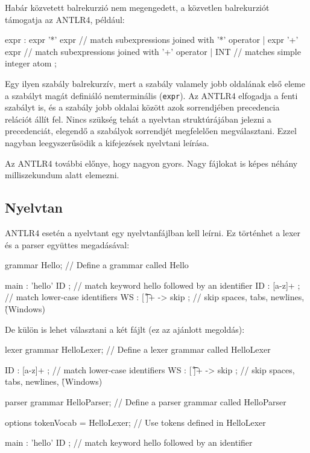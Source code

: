 \documentclass[12pt, a4paper]{report}
\newcommand{\f}[1]{\texttt{#1}}
\begin{document}
Habár közvetett balrekurzió nem megengedett, a közvetlen balrekurziót támogatja az ANTLR4, például:

\begin{antlr4code}
expr : expr '*' expr // match subexpressions joined with '*' operator
     | expr '+' expr // match subexpressions joined with '+' operator
     | INT // matches simple integer atom
;
\end{antlr4code}

Egy ilyen szabály balrekurzív, mert a szabály valamely jobb oldalának első eleme a szabályt magát definiáló nemterminális (\f{expr}). Az ANTLR4 elfogadja a fenti szabályt is, és a szabály jobb oldalai között azok sorrendjében precedencia relációt állít fel. Nincs szükség tehát a nyelvtan struktúrájában jelezni a precedenciát, elegendő a szabályok sorrendjét megfelelően megválasztani. Ezzel nagyban leegyszerűsödik a kifejezések nyelvtani leírása.

Az ANTLR4 további előnye, hogy nagyon gyors. Nagy fájlokat is képes néhány milliszekundum alatt elemezni.

\subsection{Nyelvtan}

ANTLR4 esetén a nyelvtant egy nyelvtanfájlban kell leírni. Ez történhet a lexer és a parser együttes megadásával:

\begin{antlr4code}
grammar Hello; // Define a grammar called Hello

main : 'hello' ID ; // match keyword hello followed by an identifier
ID : [a-z]+ ; // match lower-case identifiers
WS : [ \t\r\n]+ -> skip ; // skip spaces, tabs, newlines, \r (Windows)
\end{antlr4code}

De külön is lehet választani a két fájlt (ez az ajánlott megoldás):

\begin{antlr4code}
lexer grammar HelloLexer; // Define a lexer grammar called HelloLexer

ID : [a-z]+ ; // match lower-case identifiers
WS : [ \t\r\n]+ -> skip ; // skip spaces, tabs, newlines, \r (Windows)
\end{antlr4code}

\begin{antlr4code}
parser grammar HelloParser; // Define a parser grammar called HelloParser

options { tokenVocab = HelloLexer; } // Use tokens defined in HelloLexer

main : 'hello' ID ; // match keyword hello followed by an identifier
\end{antlr4code}
\end{document}
